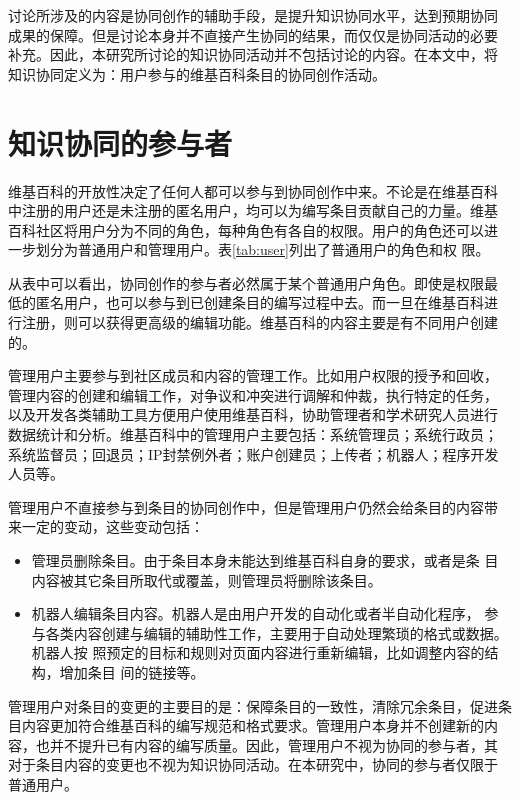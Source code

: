 讨论所涉及的内容是协同创作的辅助手段，是提升知识协同水平，达到预期协同
成果的保障。但是讨论本身并不直接产生协同的结果，而仅仅是协同活动的必要
补充。因此，本研究所讨论的知识协同活动并不包括讨论的内容。在本文中，将
知识协同定义为：用户参与的维基百科条目的协同创作活动。

\section{知识协同的参与者}
\label{sec:participants}
维基百科的开放性决定了任何人都可以参与到协同创作中来。不论是在维基百科
中注册的用户还是未注册的匿名用户，均可以为编写条目贡献自己的力量。维基
百科社区将用户分为不同的角色，每种角色有各自的权限。用户的角色还可以进
一步划分为普通用户和管理用户。表\ref{tab:user}列出了普通用户的角色和权
限。


从表中可以看出，协同创作的参与者必然属于某个普通用户角色。即使是权限最
低的匿名用户，也可以参与到已创建条目的编写过程中去。而一旦在维基百科进
行注册，则可以获得更高级的编辑功能。维基百科的内容主要是有不同用户创建
的。

管理用户主要参与到社区成员和内容的管理工作。比如用户权限的授予和回收，
管理内容的创建和编辑工作，对争议和冲突进行调解和仲裁，执行特定的任务，
以及开发各类辅助工具方便用户使用维基百科，协助管理者和学术研究人员进行
数据统计和分析。维基百科中的管理用户主要包括：系统管理员；系统行政员；
系统监督员；回退员；IP封禁例外者；账户创建员；上传者；机器人；程序开发
人员等。

管理用户不直接参与到条目的协同创作中，但是管理用户仍然会给条目的内容带
来一定的变动，这些变动包括：
\begin{itemize}
\item 管理员删除条目。由于条目本身未能达到维基百科自身的要求，或者是条
  目内容被其它条目所取代或覆盖，则管理员将删除该条目。
\item 机器人编辑条目内容。机器人是由用户开发的自动化或者半自动化程序，
  参与各类内容创建与编辑的辅助性工作，主要用于自动处理繁琐的格式或数据。机器人按
照预定的目标和规则对页面内容进行重新编辑，比如调整内容的结构，增加条目
间的链接等。
\end{itemize}
管理用户对条目的变更的主要目的是：保障条目的一致性，清除冗余条目，促进条
目内容更加符合维基百科的编写规范和格式要求。管理用户本身并不创建新的内
容，也并不提升已有内容的编写质量。因此，管理用户不视为协同的参与者，其
对于条目内容的变更也不视为知识协同活动。在本研究中，协同的参与者仅限于
普通用户。

